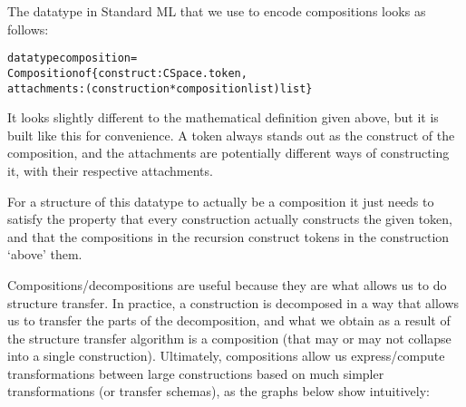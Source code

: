 \documentclass[a4paper]{article}
\theoremstyle{definition}
\begin{document}
		The datatype in Standard ML that we use to encode compositions looks as follows:
		\begin{alltt}
datatype composition =
             Composition of \{construct : CSpace.token,
                             attachments : (construction * composition list) list\}
		\end{alltt}
	It looks slightly different to the mathematical definition given above, but it is built like this for convenience. A token always stands out as the construct of the composition, and the attachments are potentially different ways of constructing it, with their respective attachments.

	For a structure of this datatype to actually be a composition it just needs to satisfy the property that every construction actually constructs the given token, and that the compositions in the recursion construct tokens in the construction `above' them.

	Compositions/decompositions are useful because they are what allows us to do structure transfer. In practice, a construction is decomposed in a way that allows us to transfer the parts of the decomposition, and what we obtain as a result of the structure transfer algorithm is a composition (that may or may not collapse into a single construction). Ultimately, compositions allow us express/compute transformations between large constructions based on much simpler transformations (or transfer schemas), as the graphs below show intuitively:
\end{document}
